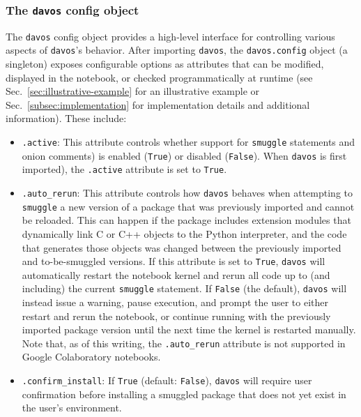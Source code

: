 \documentclass[preprint,12pt,a4paper]{elsarticle}
\begin{document}
\subsubsection{The \texttt{davos} config object}\label{subsec:config}

The \texttt{davos} config object provides a high-level interface for
controlling various aspects of \texttt{davos}'s behavior. After
importing \texttt{davos}, the \texttt{davos.con\-fig} object (a
singleton) exposes configurable options as attributes that can be
modified, displayed in the notebook, or checked programmatically at runtime
(see Sec.~\ref{sec:illustrative-example} for an illustrative example or
Sec.~\ref{subsec:implementation} for implementation details and
additional information). These include:

\begin{itemize}
\item \texttt{.active}: This attribute controls whether support for \texttt{smuggle}
  statements and onion comments) is enabled (\texttt{True}) or
  disabled (\texttt{False}).  When \texttt{davos} is first imported),
  the \texttt{.active} attribute is set to \texttt{True}.

\item \texttt{.auto\_rerun}: This attribute controls how
  \texttt{davos} behaves when attempting to \texttt{smuggle} a new
  version of a package that was previously imported and cannot be
  reloaded. This can happen if the package includes extension modules
  that dynamically link C or C++ objects to the Python interpreter,
  and the code that generates those objects was changed between the
  previously imported and to-be-smuggled versions.  If this attribute
  is set to \texttt{True}, \texttt{davos} will automatically restart
  the notebook kernel and rerun all code up to (and including) the
  current \texttt{smuggle} statement. If \texttt{False} (the default),
  \texttt{davos} will instead issue a warning, pause execution, and
  prompt the user to either restart and rerun the notebook, or
  continue running with the previously imported package version until
  the next time the kernel is restarted manually.  Note that, as of
  this writing, the \texttt{.auto\_rerun} attribute is not supported
  in Google Colaboratory notebooks.

\item \texttt{.confirm\_install}: If \texttt{True} (default:
  \texttt{False}), \texttt{davos} will require user confirmation
  before installing a smuggled package that does not yet exist in the
  user's environment.


\end{itemize}
\end{document}
